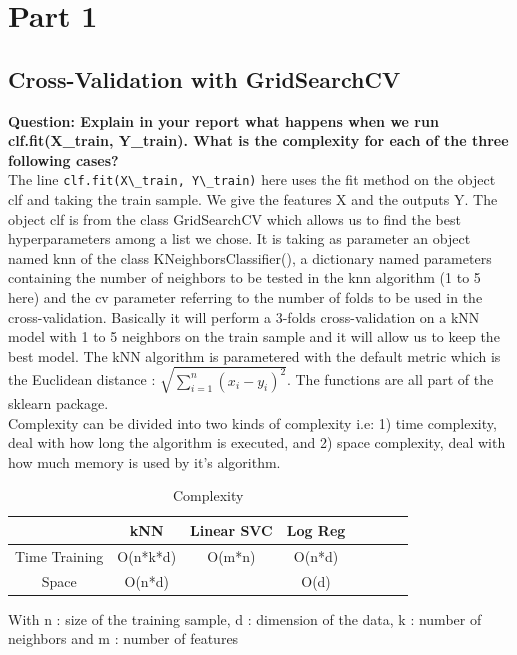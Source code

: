 \section{Part 1}

\subsection{Cross-Validation with GridSearchCV}
\textbf{{Question}: Explain in your report what happens when we run clf.fit(X\_train, Y\_train). What is the complexity for each of the three following cases?} \\

The line \verb|clf.fit(X\_train, Y\_train)| here uses the fit method on the object  clf and taking the train sample. We give the features X and the outputs Y. The object clf is from the class GridSearchCV which allows us to find the best hyperparameters among a list we chose. It is taking as parameter an object named knn of the class KNeighborsClassifier(), a dictionary named parameters containing the number of neighbors to be tested in the knn algorithm (1 to 5 here) and the cv parameter referring to the number of folds to be used in the cross-validation. Basically it will perform a 3-folds cross-validation on a kNN model with 1 to 5 neighbors on the train sample and it will allow us to keep the best model. The kNN algorithm is parametered with the default metric which is the Euclidean distance : $\sqrt{\sum^n_{i=1}(x_i - y_i)^2}$. The functions are all part of the sklearn package. \\
Complexity can be divided into two kinds of complexity i.e: 1) time complexity, deal with how long the algorithm is executed, and 2) space complexity, deal with how much memory is used by it's algorithm.\\
\begin{table}[ht]
		\caption{Complexity}
		\vspace{0.5cm}
		\centering
		\begin{tabular}{|c|c|c|c|c|c|c|c|}
			\hline
			& kNN & Linear SVC & Log Reg   \\  [0.3ex]
			\hline 
			Time Training    & O(n*k*d)       &  O(m*n)     & O(n*d)        \\ 
			\hline 
			Space  &  O(n*d)      &       &  O(d)      \\ 
			\hline 
		\end{tabular} 
        \label{table:nonlin}
	\end{table}	

With n : size of the training sample, d : dimension of the data, k : number of neighbors and m : number of features


